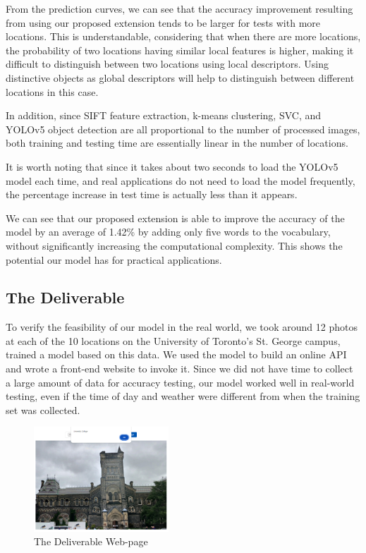 \documentclass[conference]{IEEEtran}
\begin{document}
From the prediction curves, we can see that the accuracy improvement resulting from using our proposed extension tends to be larger for tests with more locations. This is understandable, considering that when there are more locations, the probability of two locations having similar local features is higher, making it difficult to distinguish between two locations using local descriptors. Using distinctive objects as global descriptors will help to distinguish between different locations in this case.

In addition, since SIFT feature extraction, k-means clustering, SVC, and YOLOv5 object detection are all proportional to the number of processed images, both training and testing time are essentially linear in the number of locations.

It is worth noting that since it takes about two seconds to load the YOLOv5 model each time, and real applications do not need to load the model frequently, the percentage increase in test time is actually less than it appears.

We can see that our proposed extension is able to improve the accuracy of the model by an average of 1.42\% by adding only five words to the vocabulary, without significantly increasing the computational complexity. This shows the potential our model has for practical applications.

\subsection{The Deliverable}

To verify the feasibility of our model in the real world, we took around 12 photos at each of the 10 locations on the University of Toronto's St. George campus, trained a model based on this data. We used the model to build an online API and wrote a front-end website to invoke it. Since we did not have time to collect a large amount of data for accuracy testing, our model worked well in real-world testing, even if the time of day and weather were different from when the training set was collected.

\begin{figure}[H]
    \centering
    \includegraphics[width=0.45\textwidth]{fig_4.png}
    \caption{The Deliverable Web-page}
    \label{fig:4}
\end{figure}
\end{document}
